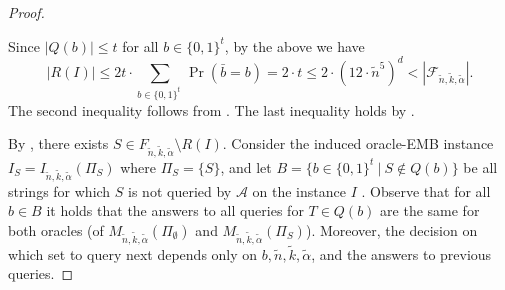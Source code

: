 \documentclass[11pt,letter]{article}
\newcommand{\cA}{{\mathcal{A}}}
\begin{document}
\begin{proof}
\begin{claimproof}
Since $\left|Q(b)\right| \leq t$ for all $b \in \{0,1\}^t$, by the above we have
			\begin{equation*}
				|R(I)| 	\leq 2  t \cdot \sum_{b \in \{0,1\}^{t}~} \Pr (\bar{b} = b) = 2  \cdot t \leq 2\cdot	\left(	12 \cdot \tilde{n}^5 \right)^{d} 
				< |\mathcal{F}_{\tilde{n},\tilde{k},\tilde{\alpha}}|. 
			\end{equation*}
			The second inequality follows from . The last inequality holds by . 
		\end{claimproof}
	
	By , there exists $S \in F_{\tilde{n},\tilde{k},\tilde{\alpha}} \setminus R(I)$. %
		Consider the induced oracle-EMB instance %
		$I_S = I_{\tilde{n},\tilde{k},\tilde{\alpha}}(\Pi_S)$ where $\Pi_{S} = \{S\}$, and let $B = \{b \in \{0,1\}^t~|~ S \notin Q(b)\}$ be all strings for which $S$ is not queried by $\cA$ on the instance $I$ .
	Observe that for all $b \in B$ it holds that the answers to all queries for $T \in Q(b)$ are the same for both oracles (of $M_{\tilde{n},\tilde{k},\tilde{\alpha}}(\Pi_{\emptyset})$ and $M_{\tilde{n},\tilde{k},\tilde{\alpha}}(\Pi_{S})$). Moreover, the decision on which set to query next depends only on $b,\tilde{n},\tilde{k},\tilde{\alpha}$, and the answers to previous queries.  
	

\end{proof}
\end{document}
